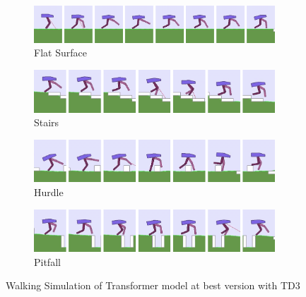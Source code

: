 \begin{figure}
	\centering
	\begin{subfigure}{.9\textwidth}
		\centering
		\includegraphics[width=0.99\textwidth]{figures/bipedal/anim/trsf_flat.png}
		\caption{Flat Surface}
		\label{fig:anim_trsf_flat}
	\end{subfigure}
	\begin{subfigure}{.9\textwidth}
		\centering
		\includegraphics[width=0.99\textwidth]{figures/bipedal/anim/trsf_stairs.png}
		\caption{Stairs}
		\label{fig:anim_trsf_stairs}
	\end{subfigure}
	\begin{subfigure}{.9\textwidth}
		\centering
		\includegraphics[width=0.99\textwidth]{figures/bipedal/anim/trsf_hurdle.png}
		\caption{Hurdle}
		\label{fig:anim_trsf_hurdle}
	\end{subfigure}
	\begin{subfigure}{.9\textwidth}
		\centering
		\includegraphics[width=0.99\textwidth]{figures/bipedal/anim/trsf_pitfall.png}
		\caption{Pitfall}
		\label{fig:anim_trsf_pitfall}
	\end{subfigure}
	\caption{Walking Simulation of Transformer model at best version with TD3}
	\label{fig:trsf_simulation}
\end{figure}
